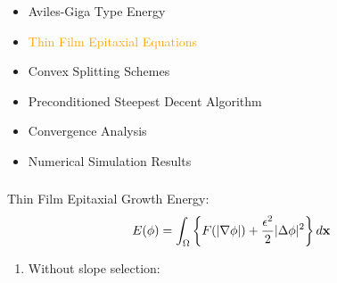 \documentclass[amstex]{beamer}
\newcommand{\wuhao}{\fontsize{10.5pt}{\baselineskip}\selectfont}    %
\begin{document}
\begin{CJK*}{GBK}{kai}
 \begin{frame}
 	\frametitle{\wuhao{\bf  Outline}}
 	\begin{itemize}%
 		\item \textcolor{orange!10}{Aviles-Giga Type Energy}
 		\item \textcolor{orange}{Thin Film Epitaxial Equations}
 		\item \textcolor{orange!10}{Convex Splitting Schemes}
 		\item \textcolor{orange!10}{Preconditioned Steepest Decent Algorithm}
 		\item \textcolor{orange!10}{Convergence Analysis}
 		\item \textcolor{orange!10}{Numerical Simulation Results}
 	\end{itemize}
 \end{frame}
 \begin{frame}
 \frametitle{\wuhao{\bf  Thin Film Epitaxial Growth Energy}}
 Thin Film Epitaxial Growth Energy:
\begin{equation}\label{eqn:etfenergy}
E(\phi) = \int_\Omega\left\{F(|\nabla \phi|)+      \frac{\epsilon^2}{2}|\Delta \phi|^2 \right\}d{\bf x}
\end{equation} 
\begin{enumerate}
\item Without slope selection:

\end{enumerate}
\end{frame}
\end{CJK*}
\end{document}
